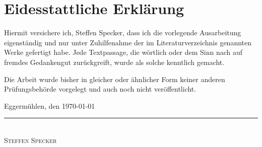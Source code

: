 
\chapter*{Eidesstattliche Erklärung}
Hiermit versichere ich, Steffen Specker, dass ich die vorlegende Ausarbeitung eigenständig und nur unter Zuhilfenahme der im Literaturverzeichnis genannten Werke gefertigt habe. Jede Textpassage, die wörtlich oder dem Sinn nach auf fremdes Gedankengut zurückgreift, wurde als solche kenntlich gemacht.\par

Die Arbeit wurde bisher in gleicher oder ähnlicher Form keiner anderen Prüfungsbehörde vorgelegt und auch noch nicht veröffentlicht.

\bigskip
\bigskip

Eggermühlen, den \today

\bigskip

\rule[-0.2cm]{5cm}{0.5pt}\\
\textsc{Steffen Specker} 


%



%
%
%
%
%
%
%
%
%
%
%
%
%
%